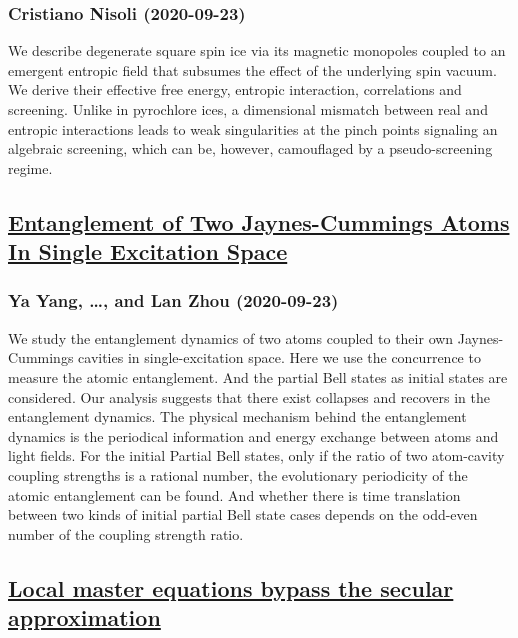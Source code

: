 \subsubsection*{Cristiano Nisoli (2020-09-23)}
We describe degenerate square spin ice via its magnetic monopoles coupled to
an emergent entropic field that subsumes the effect of the underlying spin
vacuum. We derive their effective free energy, entropic interaction,
correlations and screening. Unlike in pyrochlore ices, a dimensional mismatch
between real and entropic interactions leads to weak singularities at the pinch
points signaling an algebraic screening, which can be, however, camouflaged by
a pseudo-screening regime.

\subsection*{\href{http://arxiv.org/abs/2009.11328v1}{Entanglement of Two Jaynes-Cummings Atoms In Single Excitation Space}}
\subsubsection*{Ya Yang, \dots, and Lan Zhou (2020-09-23)}
We study the entanglement dynamics of two atoms coupled to their own
Jaynes-Cummings cavities in single-excitation space. Here we use the
concurrence to measure the atomic entanglement. And the partial Bell states as
initial states are considered. Our analysis suggests that there exist collapses
and recovers in the entanglement dynamics. The physical mechanism behind the
entanglement dynamics is the periodical information and energy exchange between
atoms and light fields. For the initial Partial Bell states, only if the ratio
of two atom-cavity coupling strengths is a rational number, the evolutionary
periodicity of the atomic entanglement can be found. And whether there is time
translation between two kinds of initial partial Bell state cases depends on
the odd-even number of the coupling strength ratio.

\subsection*{\href{http://arxiv.org/abs/2009.11324v1}{Local master equations bypass the secular approximation}}
